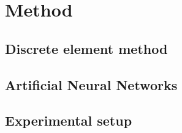 
\section{Method}
\label{sec:method}

\lipsum[1]


\subsection{Discrete element method}
\label{subsec:dem}

\lipsum[1]


\subsection{Artificial Neural Networks}
\label{subsec:ann}
\lipsum[1]


\subsection{Experimental setup}
\label{subsec:experimentalsetup}
\lipsum[1]

